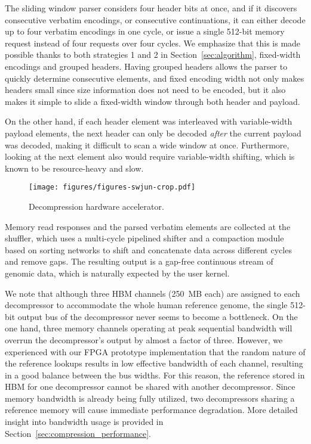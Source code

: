 The sliding window parser considers four header bits at once, and if it discovers consecutive verbatim encodings, or consecutive continuations, it can either decode up to four verbatim encodings in one cycle, or issue a single 512-bit memory request instead of four requests over four cycles.
We emphasize that this is made possible thanks to both strategies 1 and 2 in Section~\ref{sec:algorithm}, fixed-width encodings and grouped headers.
Having grouped headers allows the parser to quickly determine consecutive elements, and fixed encoding width not only makes headers small since size information does not need to be encoded, but it also makes it simple to slide a fixed-width window through both header and payload.

On the other hand, if each header element was interleaved with variable-width payload elements, the next header can only be decoded \emph{after} the current payload was decoded, making it difficult to scan a wide window at once.
Furthermore, looking at the next element also would require variable-width shifting, which is known to be resource-heavy and slow.

\begin{figure}[htb]
    \centering
    \texttt{[image: figures/figures-swjun-crop.pdf]}
    \caption{Decompression hardware accelerator.}
    \label{fig:decompression_hardware}
\end{figure}

Memory read responses and the parsed verbatim elements are collected at the shuffler, which uses a multi-cycle pipelined shifter and a compaction module based on sorting networks to shift and concatenate data across different cycles and remove gaps.
The resulting output is a gap-free continuous stream of genomic data, which is naturally expected by the user kernel.

We note that although three HBM channels (250~MB each) are assigned to each decompressor to accommodate the whole human reference genome, the single 512-bit output bus of the decompressor never seems to become a bottleneck.
On the one hand, three memory channels operating at peak sequential bandwidth will overrun the decompressor's output by almost a factor of three.
However, we experienced with our FPGA prototype implementation that the random nature of the reference lookups results in low effective bandwidth of each channel, resulting in a good balance between the bus widths.
For this reason, the reference stored in HBM for one decompressor cannot be shared with another decompressor.
Since memory bandwidth is already being fully utilized, two decompressors sharing a reference memory will cause immediate performance degradation.
More detailed insight into bandwidth usage is provided in Section~\ref{sec:compression_performance}.

